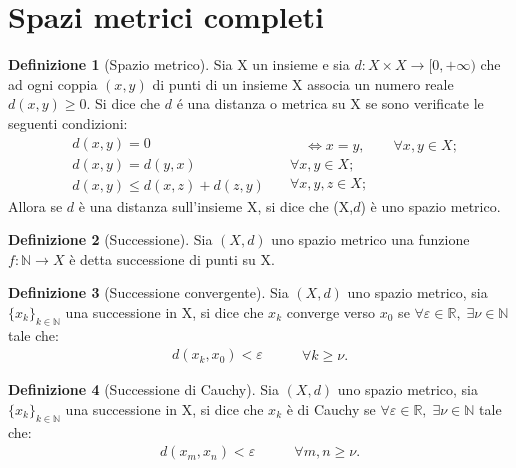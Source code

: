\documentclass[leqno]{article}
\theoremstyle{definition}
\newtheorem{definition}{Definizione}[section]
\numberwithin{equation}{section}
\theoremstyle{remark}
\begin{document}
	\section{Spazi metrici completi}
	\begin{definition}[Spazio metrico]
		Sia X un insieme e sia $d:X\times X \rightarrow [0,+ \infty)$ che ad ogni coppia $(x,y)$ di punti di un insieme X associa un numero reale $d(x,y)\ge 0$. Si dice che $d$ é una distanza o metrica su X se sono verificate le seguenti condizioni: 
		\begin{equation} 
			\begin{split}
				&d(x,y) = 0 \\
				&d(x,y)=d(y,x)\\
				&d(x,y)\le d(x,z) + d(z,y)
			\end{split}
			\quad
			\begin{split}
				\quad \Leftrightarrow x = y, \quad \quad \forall x,y \in X; \\
				\forall x,y \in X;\\
				\forall x,y,z \in X;
			\end{split}
		\end{equation}
		Allora se $d$ è una distanza sull'insieme X, si dice che (X,$d$) è uno spazio metrico.
	\end{definition}
	\begin{definition}[Successione]
		Sia $(X,d)$ uno spazio metrico una funzione $f:\mathbb{N} \rightarrow X$ è detta successione di punti su X.
	\end{definition}
	\begin{definition}[Successione convergente]
		Sia $(X,d)$ uno spazio metrico, sia $\{ x_k \} _{k \in \mathbb{N}}$ una successione in X, si dice che $x_k$ converge verso $x_0$ se $\forall \varepsilon \in \mathbb{R}, \; \exists  \nu \in \mathbb{N}$ tale che:
		\begin{equation}
			\begin{split}
				d(x_k,x_0)<\varepsilon
			\end{split}
			\quad  \quad 
			\begin{split}
				\forall k \ge \nu.
			\end{split}
		\end{equation}
	\end{definition}
	\begin{definition}[Successione di Cauchy]
		Sia $(X,d)$ uno spazio metrico, sia $\{x_k\}_{k\in\mathbb{N}}$ una successione in X, si dice che $x_k$ è di Cauchy se $\forall \varepsilon \in \mathbb{R}, \; \exists  \nu \in \mathbb{N}$ tale che:
		\begin{equation}
			\begin{split}
				d(x_m,x_n)<\varepsilon
			\end{split}
			\quad  \quad 
			\begin{split}
				\forall m,n \ge \nu.
			\end{split}
		\end{equation}
	\end{definition}
\end{document}
